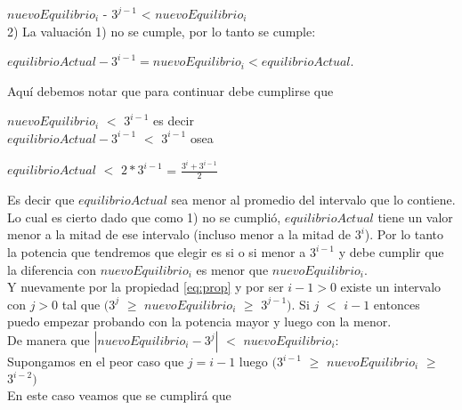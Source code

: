$nuevoEquilibrio_{i}$ - $3^{j-1}$ < $nuevoEquilibrio_{i}$ \\

2) La valuación 1) no se cumple, por lo tanto se cumple:\\

\begin{center}

$equilibrioActual - 3^{i-1} = nuevoEquilibrio_{i} < equilibrioActual$. \\

\end{center}

Aquí debemos notar que para continuar debe cumplirse que 

\begin{center}

$nuevoEquilibrio_{i}$ $<$ $3^{i-1}$ es decir \\

$equilibrioActual - 3^{i-1}$ $<$ $3^{i-1}$ osea 

$equilibrioActual$ $<$ $2 \ast 3^{i-1}$ = $\frac{3^{i}+3^{i-1}}{2}$ \\ 

\end{center}

Es decir que $equilibrioActual$ sea menor al promedio del intervalo que lo contiene. Lo cual es cierto dado que como 1) no se cumplió, $equilibrioActual$ tiene un valor menor a la mitad de ese intervalo (incluso menor a la mitad de $3^i$). Por lo tanto la potencia que tendremos que elegir es si o si menor a $3^{i-1}$ y debe cumplir que la diferencia con $nuevoEquilibrio_{i}$ es menor que $nuevoEquilibrio_{i}$.\\

Y nuevamente por la propiedad \eqref{eq:prop} y por ser $i-1 > 0$ existe un intervalo con $j > 0$ tal que  $(3^j$ $\geq$ $nuevoEquilibrio_{i}$ $\geq$ $3^{j-1})$. Si $j$ $<$ $i-1$ entonces puedo empezar probando con la potencia mayor y luego con la menor.\\

De manera que $|nuevoEquilibrio_{i} - 3^j|$ $<$ $nuevoEquilibrio_{i}$: \\

Supongamos en el peor caso que $j=i-1$ luego $(3^{i-1}$ $\geq$ $nuevoEquilibrio_{i}$ $\geq$ $3^{i-2})$ \\

En este caso veamos que se cumplirá que \\

